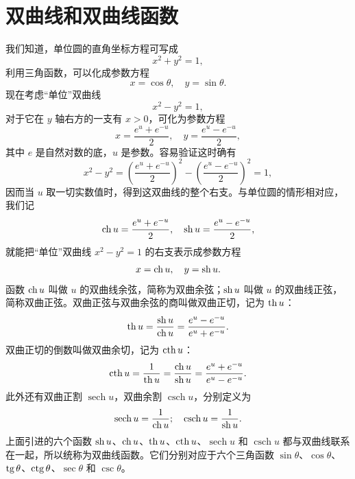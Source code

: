 \section{双曲线和双曲线函数}

我们知道，单位圆的直角坐标方程可写成
\[
  x^2 + y^2 = 1,
\]
利用三角函数，可以化成参数方程
\[
  x = \cos\theta,\quad y = \sin\theta.
\]
现在考虑“单位”双曲线
\[
  x^2 - y^2 = 1,
\]
对于它在 $y$ 轴右方的一支有 $x>0$，可化为参数方程
\[
  x = \frac{e^u+e^{-u}}{2},\quad y = \frac{e^u-e^{-u}}{2},
\]
其中 $e$ 是自然对数的底，$u$ 是参数。容易验证这时确有
\[
  x^2 - y^2 = \left(\frac{e^u+e^{-u}}{2}\right)^2 - \left(\frac{e^u-e^{-u}}{2}\right)^2 = 1,
\]
因而当 $u$ 取一切实数值时，得到这双曲线的整个右支。与单位圆的情形相对应，我们记
\[
  \operatorname{ch} u = \frac{e^u+e^{-u}}{2},\quad \operatorname{sh} u = \frac{e^u-e^{-u}}{2},
\]
就能把“单位”双曲线 $x^2-y^2=1$ 的右支表示成参数方程
\[
  x = \operatorname{ch} u,\quad y = \operatorname{sh} u.
\]
函数 $\operatorname{ch} u$ 叫做 $u$ 的双曲线余弦，简称为双曲余弦；$\operatorname{sh} u$ 叫做 $u$ 的双曲线正弦，简称双曲正弦。双曲正弦与双曲余弦的商叫做双曲正切，记为 $\operatorname{th} u$：
\[
  \operatorname{th} u = \frac{\operatorname{sh} u}{\operatorname{ch} u} = \frac{e^u-e^{-u}}{e^u+e^{-u}}.
\]
双曲正切的倒数叫做双曲余切，记为 $\operatorname{cth} u$：
\[
  \operatorname{cth} u = \frac{1}{\operatorname{th} u} = \frac{\operatorname{ch} u}{\operatorname{sh} u} = \frac{e^u+e^{-u}}{e^u-e^{-u}}.
\]
此外还有双曲正割 $\operatorname{sech} u$，双曲余割 $\operatorname{csch} u$，分别定义为
\[
  \operatorname{sech} u = \frac{1}{\operatorname{ch} u};\quad \operatorname{csch} u = \frac{1}{\operatorname{sh} u}.
\]
上面引进的六个函数 $\operatorname{sh} u$、$\operatorname{ch} u$、$\operatorname{th} u$、$\operatorname{cth} u$、$\operatorname{sech} u$ 和 $\operatorname{csch} u$ 都与双曲线联系在一起，所以统称为双曲线函数。它们分别对应于六个三角函数 $\sin\theta$、$\cos\theta$、$\operatorname{tg}\theta$、$\operatorname{ctg}\theta$、$\sec\theta$ 和 $\csc\theta$。


